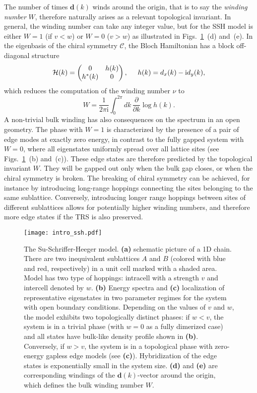 The number of times $\mathbf{d}(k)$ winds around the origin, that is to say the \emph{winding number} $W$, therefore naturally arises as a relevant topological invariant. In general, the winding number can take any integer value, but for the SSH model is either $W= 1$ (if $v < w$) or $W = 0$ ($v > w$) as illustrated in Figs.~\ref{fig:ssh}~(d) and~(e). In the eigenbasis of the chiral symmetry $\mathcal{C}$, the Bloch Hamiltonian has a block off-diagonal structure
\begin{equation}
\mathcal{H} (k) = \begin{pmatrix}
0 & h( k) \\
h^* (k) & 0
\end{pmatrix}, \hspace*{0.5cm} h(k) = d_x (k) - \mathrm{i} d_y (k), 
\label{eq:H-Cbasis}
\end{equation}
which reduces the computation of the winding number $\nu$ to
\begin{equation}
W = \frac{\mathrm{1}}{2 \pi \mathrm{i}} \int_{0}^{2 \pi}  d k \,   \frac{\partial}{\partial k} \log h(k).
\label{eq:winding}
\end{equation}
A non-trivial bulk winding has also consequences on the spectrum in an open geometry. The phase with $W=1$ is characterized by the presence of a pair of edge modes at exactly zero energy, in contrast to the fully gapped system with $W = 0$, where all eigenstates uniformly spread over all lattice sites (see Figs.~\ref{fig:ssh}~(b) and~(c)). These edge states are therefore predicted by the topological invariant $W$. They will be gapped out only when the bulk gap closes, or when the chiral symmetry is broken. The breaking of chiral symmetry can be achieved, for instance by introducing long-range hoppings connecting the sites belonging to the same sublattice. Conversely, introducing longer range hoppings between sites of different sublattices allows for potentially higher winding numbers, and therefore more edge states if the TRS is also preserved.

\begin{figure}[H]
\centering
\texttt{[image: intro\_ssh.pdf]}
\caption[The Su-Schriffer-Heeger model]{The Su-Schriffer-Heeger model. \textbf{(a)} schematic picture of a 1D chain. There are two inequivalent sublattices $A$ and $B$ (colored with blue and red, respectively) in a unit cell marked with a shaded area. Model has two type of hoppings: intracell with a strength $v$ and intercell denoted by $w$. \textbf{(b)} Energy spectra and \textbf{(c)} localization of representative eigenstates in two parameter regimes for the system with open boundary conditions. Depending on the values of $v$ and $w$, the model exhibits two topologically distinct phases: if $w < v$,  the system is in a trivial phase (with $w = 0$ as a fully dimerized case) and all states have bulk-like density profile shown in \textbf{(b)}. Conversely, if $w > v$, the system is in a topological phase with zero-energy gapless edge models (see \textbf{(c)}). Hybridization of the edge states is exponentially small in the system size. \textbf{(d)} and \textbf{(e)} are corresponding windings of the $\mathbf{d} (k)$-vector around the origin, which defines the bulk winding number $W$.}
\label{fig:ssh}
\end{figure}